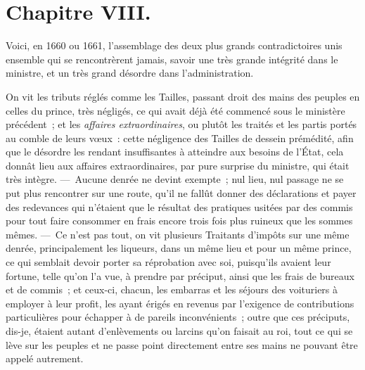 \documentclass[french,twoside]{book} %
\begin{document}
\section[{Chapitre VIII.}]{Chapitre VIII.}
\noindent Voici, en 1660 ou 1661, l’assemblage des deux plus grands contradictoires unis ensemble qui se rencontrèrent jamais, savoir une très grande intégrité dans le ministre, et un très grand désordre dans l’administration.\par
On vit les tributs réglés comme les Tailles, passant droit des mains des peuples en celles du prince, très négligés, ce qui avait déjà été commencé sous le ministère précédent ; et les {\itshape affaires extraordinaires}, ou plutôt les traités et les partis portés au comble de leurs vœux : cette négligence des Tailles de dessein prémédité, afin que le désordre les rendant insuffisantes à atteindre aux besoins de l’État, cela donnât lieu aux affaires extraordinaires, par pure surprise du ministre, qui était très intègre. — Aucune denrée ne devint exempte ; nul lieu, nul passage ne se put plus rencontrer sur une route, qu’il ne fallût donner des déclarations et payer des redevances qui n’étaient que le résultat des pratiques usitées par des commis pour tout faire consommer en frais encore trois fois plus ruineux que les sommes mêmes. — Ce n’est pas tout, on vit plusieurs Traitants d’impôts sur une même denrée, principalement les liqueurs, dans un même lieu et pour un même prince, ce qui semblait devoir porter sa réprobation avec soi, puisqu’ils avaient leur fortune, telle qu’on l’a vue, à prendre par préciput, ainsi que les frais de bureaux et de commis ; et ceux-ci, chacun, les embarras et les séjours des voituriers à employer à leur profit, les ayant érigés en revenus par l’exigence de contributions particulières pour échapper à de pareils inconvénients ; outre que ces préciputs, dis-je, étaient autant d’enlèvements ou larcins qu’on faisait au roi, tout ce qui se lève sur les peuples et ne passe point directement entre ses mains ne pouvant être appelé autrement.\par
\end{document}
